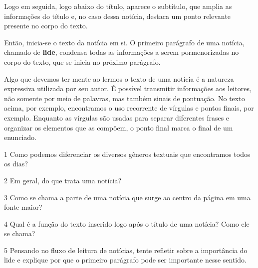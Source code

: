{Logo em seguida, logo abaixo do título, aparece o subtítulo, que amplia as informações do título e, no caso dessa notícia, destaca um ponto relevante presente no corpo do texto.

Então, inicia-se o texto da notícia em si. O primeiro parágrafo de uma notícia, chamado de \textbf{lide}, condensa todas as informações a serem pormenorizadas no corpo do texto, que se inicia no próximo parágrafo.

Algo que devemos ter mente ao lermos o texto de uma notícia é a natureza
expressiva utilizada por seu autor. É possível transmitir informações
aos leitores, não somente por meio de palavras, mas também sinais de
pontuação. No texto acima, por exemplo, encontramos o uso recorrente de
vírgulas e pontos finais, por exemplo. Enquanto as vírgulas são usadas
para separar diferentes frases e organizar os elementos que as compõem, o
ponto final marca o final de um enunciado.}


\num{1} Como podemos diferenciar os diversos gêneros textuais que
encontramos todos os dias?



\num{2} Em geral, do que trata uma notícia?


\num{3} Como se chama a parte de uma notícia que surge ao centro da página
em uma fonte maior?


\num{4} Qual é a função do texto inserido logo após o título de uma notícia? Como ele se chama?


\num{5} Pensando no fluxo de leitura de notícias, tente refletir sobre a importância do lide e explique por que o primeiro parágrafo pode ser importante nesse sentido.


